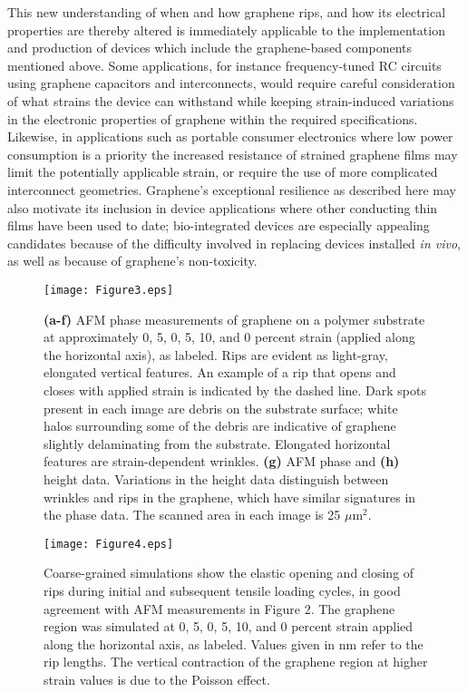 \documentclass[%
 aps,
 pra,
 longbibliography,
 amsmath,amssymb,
 reprint,
 superscriptaddress,
]{revtex4-1}
\begin{document}
This new understanding of when and how graphene rips, and how its electrical
properties are thereby altered is immediately applicable to the implementation
and production of devices which include the graphene-based components mentioned
above. Some applications, for instance frequency-tuned RC circuits using
graphene capacitors and interconnects, would require careful consideration of
what strains the device can withstand while keeping strain-induced variations
in the electronic properties of graphene within the required specifications.
Likewise, in applications such as portable consumer electronics where low power
consumption is a priority the increased resistance of strained graphene films
may limit the potentially applicable strain, or require the use of more
complicated interconnect geometries\cite{Kim2011}. Graphene's exceptional
resilience as described here may also motivate its inclusion in device
applications where other conducting thin films have been used to date;
bio-integrated devices\cite{Viventi2010} are especially appealing candidates
because of the difficulty involved in replacing devices installed \textit{in
vivo}, as well as because of graphene's non-toxicity.

\begin{figure*}
\centering
\texttt{[image: Figure3.eps]}
\caption{\textbf{(a-f)} AFM phase measurements of graphene on a polymer
    substrate at approximately 0, 5, 0, 5, 10, and 0 percent strain (applied along
    the horizontal axis), as labeled. Rips are evident as light-gray, elongated
    vertical features. An example of a rip that opens and closes with applied
    strain is indicated by the dashed line. Dark spots present in each image are
    debris on the substrate surface; white halos surrounding some of the debris are
    indicative of graphene slightly delaminating from the substrate. Elongated
    horizontal features are strain-dependent wrinkles. \textbf{(g)} AFM phase and
    \textbf{(h)} height data. Variations in the height data distinguish between
    wrinkles and rips in the graphene, which have similar signatures in the phase
    data. The scanned area in each image is 25 $\mu$m$^2$.}
\label{fig:rips}
\end{figure*}

\begin{figure}
\texttt{[image: Figure4.eps]}
\caption{Coarse-grained simulations show the elastic opening and closing of
    rips during initial and subsequent tensile loading cycles, in good agreement
    with AFM measurements in Figure 2. The graphene region was simulated at 0, 5,
    0, 5, 10, and 0 percent strain applied along the horizontal axis, as labeled.
    Values given in nm refer to the rip lengths. The vertical contraction of the
    graphene region at higher strain values is due to the Poisson effect.}
\label{fig:Simulation}
\end{figure}
\end{document}
